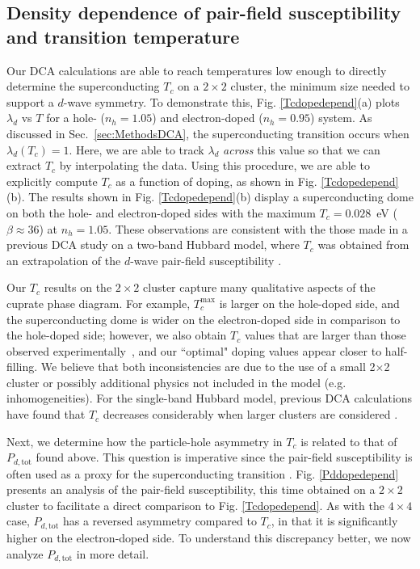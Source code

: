 \documentclass[reprint,nofootinbib,nobibnotes,amsmath,amssymb,aps,prb,floatfix]{revtex4-2}
\newcommand{\figdisp}[1]{Fig. \ref{#1}}
\begin{document}
\subsection{Density dependence of pair-field susceptibility and transition temperature}\label{Tc}
Our DCA calculations are able to reach temperatures low enough to directly determine the superconducting $T_c$ on a $2\times2$ cluster, the minimum size needed to support a $d$-wave symmetry. To demonstrate this, 
\figdisp{Tcdopedepend}(a) plots $\lambda_d$ vs $T$ for a hole- ($n_h=1.05$) and electron-doped ($n_h=0.95$) system. As discussed in Sec.~\ref{sec:MethodsDCA}, the superconducting transition occurs when $\lambda_d(T_c)=1$. Here, we are able to track $\lambda_d$ \textit{across} this value so that we can extract $T_c$ by  interpolating the data. 
Using this procedure, we are able to explicitly compute $T_c$ as a function of doping, as shown in \figdisp{Tcdopedepend}(b). The results shown in \figdisp{Tcdopedepend}(b) display a superconducting dome on both the hole- and electron-doped sides with the maximum $T_c=0.028$~eV ($\beta\approx 36$) at $n_h=1.05$. These observations are consistent with the those made in a previous DCA study on a two-band Hubbard model, where $T_c$ was obtained from an extrapolation of the $d$-wave pair-field susceptibility  \cite{Macridin}. 

Our $T_c$ results on the $2\times2$ cluster capture many qualitative aspects of the cuprate phase diagram. For example, $T_c^\mathrm{max}$ is larger on the hole-doped side, and the superconducting dome is wider on the electron-doped side in comparison to the hole-doped side; however, we also obtain $T_c$ values that are larger than those observed experimentally~\cite{Tallon}, and our ``optimal" doping values appear closer to half-filling. We believe that both inconsistencies are due to the use of a small 2$\times$2 cluster or possibly additional physics not included in the model (e.g.  inhomogeneities). For the single-band Hubbard model, previous DCA calculations have found that $T_c$ decreases considerably when larger clusters are considered \cite{Maier2}. 

Next, we determine how the particle-hole asymmetry in $T_c$ is related to that of $P_{d,\text{tot}}$ found above. This question is imperative since the pair-field susceptibility is often used as a proxy for the superconducting transition \cite{Maier2, Scalettar, Biborski,  Macridin}. \figdisp{Pddopedepend} presents an analysis of the pair-field susceptibility, this time obtained on a $2\times 2$ cluster to facilitate a direct comparison to \figdisp{Tcdopedepend}. 
As with the $4\times4$ case, $P_{d,\text{tot}}$ has a reversed asymmetry compared to $T_c$, in that it is significantly higher on the electron-doped side. 
To understand this discrepancy better, we now analyze $P_{d,\text{tot}}$ in more detail. 
\end{document}
